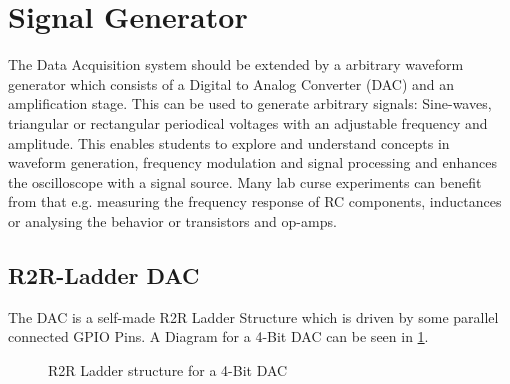 \section{Signal Generator}

The Data Acquisition system should be extended by a arbitrary waveform generator which consists of a Digital to Analog Converter (DAC) and an amplification stage. This can be used to generate arbitrary signals: Sine-waves, triangular or rectangular periodical voltages with an adjustable frequency and amplitude. This enables students to explore and understand concepts in waveform generation, frequency modulation and signal processing and enhances the oscilloscope with a signal source. Many lab curse experiments can benefit from that e.g. measuring the frequency response of RC components, inductances or analysing the behavior or transistors and op-amps.

\subsection{R2R-Ladder DAC}

The DAC is a self-made R2R Ladder Structure which is driven by some parallel connected GPIO Pins. A Diagram for a 4-Bit DAC can be seen in \cref{fig:r2r-ladder}.

\begin{figure}[htb]
	\centering
	\caption{R2R Ladder structure for a 4-Bit DAC}
	\label{fig:r2r-ladder}
\end{figure}

